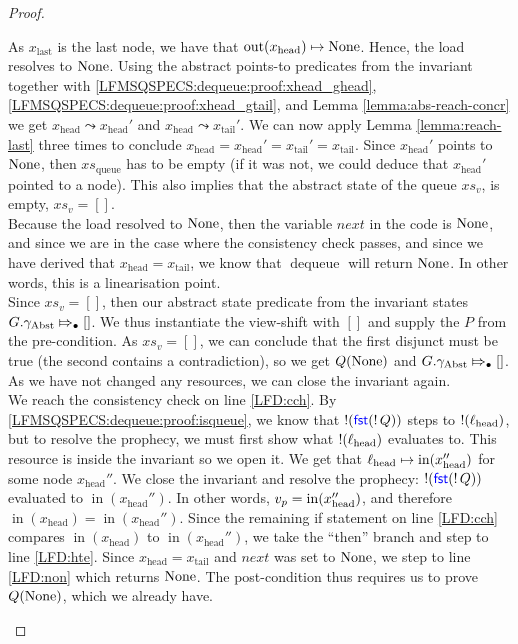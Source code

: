 \documentclass[a4paper, 10pt]{report}
\theoremstyle{definition}
\newcommand{\dequeue}{\operatorname{dequeue}}
\newcommand{\xsqueue}{xs_{\mathrm{queue}}}
\newcommand{\locN}[1]{\loc_{\mathrm{#1}}}
\newcommand{\lochead}{\locN{head}}
\newcommand{\nIn}[1]{\operatorname{in}(#1)}
\newcommand{\nOut}[1]{\operatorname{out}(#1)}
\newcommand{\node}{x}
\newcommand{\nodeN}[1]{\node_{\mathrm{#1}}}
\newcommand{\nodehead}{\nodeN{head}}
\newcommand{\nodetail}{\nodeN{tail}}
\newcommand{\nodelast}{\nodeN{last}}
\newcommand{\absvalueList}{xs_v}
\newcommand{\prophval}{\val_p}
\newcommand{\Qg}{G}
\newcommand{\gabst}{\gname_{\mathrm{Abst}}}
\newcommand{\abstractstateauth}[2]{#1 \Mapsto_{\bullet} #2}
\newcommand{\reach}[2]{#1 \leadsto #2}
\begin{document}
\begin{proof}
\begin{itemize}
\begin{itemize}
      As $\nodelast$ is the last node, we have that $\nOut{\nodehead} \mapsto \None$. Hence, the load resolves to $\operatorname{None}$. Using the abstract points-to predicates from the invariant together with \ref{LFMSQSPECS:dequeue:proof:xhead_ghead}, \ref{LFMSQSPECS:dequeue:proof:xhead_gtail}, and Lemma \ref{lemma:abs-reach-concr} we get $\reach{\nodehead}{\nodehead'}$ and $\reach{\nodehead}{\nodetail'}$. We can now apply Lemma \ref{lemma:reach-last} three times to conclude $\nodehead = \nodehead' = \nodetail' = \nodetail$. Since $\nodehead'$ points to $\operatorname{None}$, then $\xsqueue$ has to be empty (if it was not, we could deduce that $\nodehead'$ pointed to a node). This also implies that the abstract state of the queue $\absvalueList$, is empty, $\absvalueList = []$.\\
      Because the load resolved to $\operatorname{None}$, then the variable $next$ in the code is $\operatorname{None}$, and since we are in the case where the consistency check passes, and since we have derived that $\nodehead = \nodetail$, we know that $\dequeue$ will return $\operatorname{None}$. In other words, this is a linearisation point.\\
      Since $\absvalueList = []$, then our abstract state predicate from the invariant states $\abstractstateauth{\Qg.\gabst}{[]}$. We thus instantiate the view-shift with $[]$ and supply the $P$ from the pre-condition. As $\absvalueList = []$, we can conclude that the first disjunct must be true (the second contains a contradiction), so we get $Q(\operatorname{None})$ and $\abstractstateauth{\Qg.\gabst}{[]}$. As we have not changed any resources, we can close the invariant again.\\
      We reach the consistency check on line \ref{LFD:cch}. By \ref{LFMSQSPECS:dequeue:proof:isqueue}, we know that $\mathop{!}(\operatorname{\textsf{\color{blue} fst}} (\mathop{!} Q))$ steps to $\deref(\lochead)$, but to resolve the prophecy, we must first show what $\deref(\lochead)$ evaluates to. This resource is inside the invariant so we open it. We get that $\lochead \mapsto \nIn{\nodehead''}$ for some node $\nodehead''$. We close the invariant and resolve the prophecy: $\mathop{!}(\operatorname{\textsf{\color{blue} fst}} (\mathop{!} Q))$ evaluated to $\nIn{\nodehead''}$. In other words, $\prophval = \nIn{\nodehead''}$, and therefore $\nIn{\nodehead} = \nIn{\nodehead''}$. Since the remaining if statement on line \ref{LFD:cch} compares $\nIn{\nodehead}$ to $\nIn{\nodehead''}$, we take the ``then'' branch and step to line \ref{LFD:hte}. Since $\nodehead = \nodetail$ and $next$ was set to $\operatorname{None}$, we step to line \ref{LFD:non} which returns $\operatorname{None}$. The post-condition thus requires us to prove $Q(\operatorname{None})$, which we already have.


\end{itemize}
\end{itemize}
\end{proof}
\end{document}

